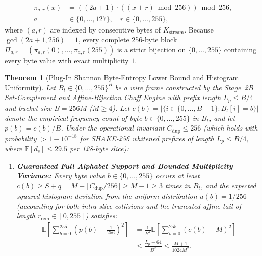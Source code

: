 \documentclass[conference,10pt]{IEEEtran}
\newtheorem{theorem}{Theorem}
\begin{document}
\begin{enumerate}
    \begin{equation}
    \label{eq:affine_bijection}
    \begin{aligned}
    \pi_{a, r}(x) &= \left((2a + 1) \cdot ((x + r) \bmod 256)\right) \bmod 256, \\
    a &\in \{0,\dots,127\},\quad r \in \{0,\dots,255\},
    \end{aligned}
    \end{equation}
    where $(a, r)$ are indexed by consecutive bytes of $K_{\text{stream}}$. Because $\gcd(2a+1, 256) = 1$, every complete 256-byte block $\Pi_{a,r} = (\pi_{a,r}(0), \dots, \pi_{a,r}(255))$ is a strict bijection on $\{0,\dots,255\}$ containing every byte value with exact multiplicity $1$.
\end{enumerate}

\begin{theorem}[Plug-In Shannon Byte-Entropy Lower Bound and Histogram Uniformity]
\label{thm:entropy}
Let $B_t \in \{0,\dots,255\}^B$ be a wire frame constructed by the Stage~2B Set-Complement and Affine-Bijection Chaff Engine with prefix length $L_p \le B / 4$ and bucket size $B = 256 M$ ($M \ge 4$). Let $c(b) = |\{i \in \{0,\dots,B-1\} : B_t[i] = b\}|$ denote the empirical frequency count of byte $b \in \{0,\dots,255\}$ in $B_t$, and let $p(b) = c(b) / B$. Under the operational invariant $C_{\text{dup}} \le 256$ (which holds with probability $> 1 - 10^{-18}$ for SHAKE-256 whitened prefixes of length $L_p \le B / 4$, where $\mathbb{E}[d_s] \le 29.5$ per 128-byte slice):
\begin{enumerate}
    \item \textbf{Guaranteed Full Alphabet Support and Bounded Multiplicity Variance:} Every byte value $b \in \{0,\dots,255\}$ occurs at least $c(b) \ge S + q = M - \lceil C_{\text{dup}} / 256 \rceil \ge M - 1 \ge 3$ times in $B_t$, and the expected squared histogram deviation from the uniform distribution $u(b) = 1/256$ (accounting for both intra-slice collisions and the truncated affine tail of length $r_{\text{rem}} \in [0, 255]$) satisfies:
    \begin{equation}
    \label{eq:l2_dev}
    \begin{aligned}
    \mathbb{E}\left[\sum_{b=0}^{255} \left(p(b) - \frac{1}{256}\right)^2\right] &= \frac{1}{B^2} \mathbb{E}\left[\sum_{b=0}^{255} (c(b) - M)^2\right] \\
    &\le \frac{L_p + 64}{B^2} \le \frac{M + 1}{1024 M^2}.
    \end{aligned}
    \end{equation}

\end{enumerate}
\end{theorem}
\end{document}
